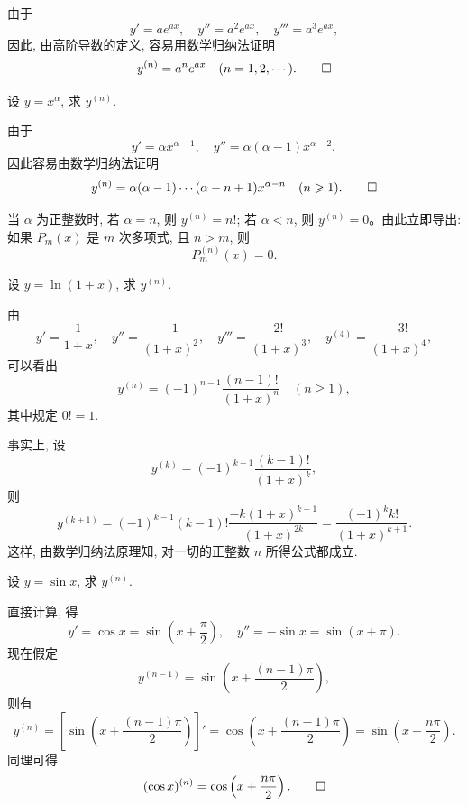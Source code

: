 \begin{solve}
由于
\[
  y'=ae^{ax},\quad y''=a^2e^{ax},\quad y'''=a^3e^{ax},
\]
因此, 由高阶导数的定义, 容易用数学归纳法证明
\[
  y^{(n)}=a^ne^{ax}\quad(n=1,2,\cdots).
\qedhere
\]
\end{solve}


\begin{example}\label{example:ma-4-4-2}
设 $y=x^\alpha$, 求 $y^{(n)}$.
\end{example}


\begin{solve}
由于
\[
  y'=\alpha x^{\alpha-1},\quad y''=\alpha(\alpha-1)x^{\alpha-2},
\]
因此容易由数学归纳法证明
\[
  y^{(n)}
  =
  \alpha(\alpha-1)\cdots(\alpha-n+1)x^{\alpha-n}
  \quad(n\geqslant1).
\qedhere
\]
\end{solve}


\begin{remark}\label{remark:ma-4-source-78}
当 $\alpha$ 为正整数时, 若 $\alpha=n$, 则 $y^{(n)}=n!$; 若 $\alpha<n$, 则 $y^{(n)}=0$。由此立即导出: 如果 $P_m(x)$ 是 $m$ 次多项式, 且 $n>m$, 则
\[
  P_m^{(n)}(x)=0.
\]
\end{remark}


\begin{example}\label{example:ma-4-4-3}
设 $y=\ln(1+x)$, 求 $y^{(n)}$.
\end{example}


\begin{solve}
由
\[
  y'=\frac{1}{1+x},\quad
  y''=\frac{-1}{(1+x)^2},\quad
  y'''=\frac{2!}{(1+x)^3},\quad
  y^{(4)}=\frac{-3!}{(1+x)^4},
\]
可以看出
\[
  y^{(n)}
  =
  (-1)^{n-1}\frac{(n-1)!}{(1+x)^n}
  \quad(n\geqslant1),
\]
其中规定 $0!=1$.

事实上, 设
\[
  y^{(k)}
  =
  (-1)^{k-1}\frac{(k-1)!}{(1+x)^k},
\]
则
\[
  y^{(k+1)}
  =
  (-1)^{k-1}(k-1)!\frac{-k(1+x)^{k-1}}{(1+x)^{2k}}
  =
  \frac{(-1)^kk!}{(1+x)^{k+1}}.
\]
这样, 由数学归纳法原理知, 对一切的正整数 $n$ 所得公式都成立.
\end{solve}


\begin{example}\label{example:ma-4-4-4}
设 $y=\sin x$, 求 $y^{(n)}$.
\end{example}


\begin{solve}
直接计算, 得
\[
  y'=\cos x=\sin\left(x+\frac{\pi}{2}\right),
  \quad
  y''=-\sin x=\sin(x+\pi).
\]
现在假定
\[
  y^{(n-1)}
  =
  \sin\left(x+\frac{(n-1)\pi}{2}\right),
\]
则有
\[
  y^{(n)}
  =
  \left[\sin\left(x+\frac{(n-1)\pi}{2}\right)\right]'
  =
  \cos\left(x+\frac{(n-1)\pi}{2}\right)
  =
  \sin\left(x+\frac{n\pi}{2}\right).
\]
同理可得
\[
  (\cos x)^{(n)}
  =
  \cos\left(x+\frac{n\pi}{2}\right).
\qedhere
\]
\end{solve}


